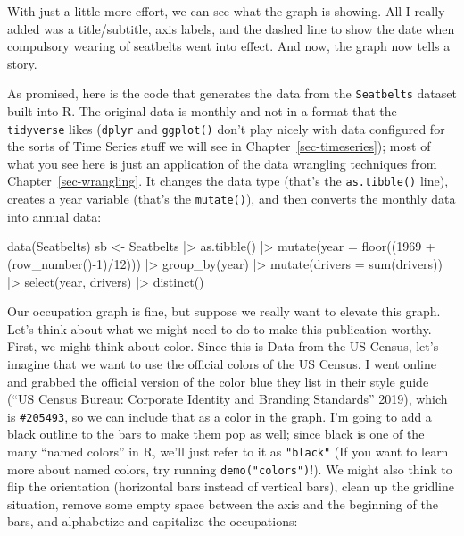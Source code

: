 \documentclass[
  letterpaper,
]{book}
\newenvironment{Shaded}{\begin{snugshade}}{\end{snugshade}}
\newcommand{\AttributeTok}[1]{\textcolor[rgb]{0.40,0.45,0.13}{#1}}
\newcommand{\DecValTok}[1]{\textcolor[rgb]{0.68,0.00,0.00}{#1}}
\newcommand{\FunctionTok}[1]{\textcolor[rgb]{0.28,0.35,0.67}{#1}}
\newcommand{\NormalTok}[1]{\textcolor[rgb]{0.00,0.23,0.31}{#1}}
\newcommand{\OtherTok}[1]{\textcolor[rgb]{0.00,0.23,0.31}{#1}}
\newcommand{\SpecialCharTok}[1]{\textcolor[rgb]{0.37,0.37,0.37}{#1}}
\begin{document}
\begin{tcolorbox}
With just a little more effort, we can see what the graph is showing.
All I really added was a title/subtitle, axis labels, and the dashed
line to show the date when compulsory wearing of seatbelts went into
effect. And now, the graph now tells a story.

As promised, here is the code that generates the data from the
\texttt{Seatbelts} dataset built into R. The original data is monthly
and not in a format that the \texttt{tidyverse} likes (\texttt{dplyr}
and \texttt{ggplot()} don't play nicely with data configured for the
sorts of Time Series stuff we will see in Chapter~\ref{sec-timeseries});
most of what you see here is just an application of the data wrangling
techniques from Chapter~\ref{sec-wrangling}. It changes the data type
(that's the \texttt{as.tibble()} line), creates a year variable (that's
the \texttt{mutate()}), and then converts the monthly data into annual
data:

\begin{Shaded}
\begin{Highlighting}[]
\FunctionTok{data}\NormalTok{(Seatbelts)}
\NormalTok{sb }\OtherTok{\textless{}{-}}\NormalTok{ Seatbelts }\SpecialCharTok{|\textgreater{}} 
  \FunctionTok{as.tibble}\NormalTok{() }\SpecialCharTok{|\textgreater{}} 
  \FunctionTok{mutate}\NormalTok{(}\AttributeTok{year =} \FunctionTok{floor}\NormalTok{((}\DecValTok{1969} \SpecialCharTok{+}\NormalTok{ (}\FunctionTok{row\_number}\NormalTok{()}\SpecialCharTok{{-}}\DecValTok{1}\NormalTok{)}\SpecialCharTok{/}\DecValTok{12}\NormalTok{))) }\SpecialCharTok{|\textgreater{}} 
  \FunctionTok{group\_by}\NormalTok{(year) }\SpecialCharTok{|\textgreater{}} 
  \FunctionTok{mutate}\NormalTok{(}\AttributeTok{drivers =} \FunctionTok{sum}\NormalTok{(drivers)) }\SpecialCharTok{|\textgreater{}} 
  \FunctionTok{select}\NormalTok{(year, drivers) }\SpecialCharTok{|\textgreater{}} 
  \FunctionTok{distinct}\NormalTok{()}
\end{Highlighting}
\end{Shaded}

\end{tcolorbox}

Our occupation graph is fine, but suppose we really want to elevate this
graph. Let's think about what we might need to do to make this
publication worthy. First, we might think about color. Since this is
Data from the US Census, let's imagine that we want to use the official
colors of the US Census. I went online and grabbed the official version
of the color blue they list in their style guide ({``US Census Bureau:
Corporate Identity and Branding Standards''} 2019), which is
\texttt{\#205493}, so we can include that as a color in the graph. I'm
going to add a black outline to the bars to make them pop as well; since
black is one of the many ``named colors'' in R, we'll just refer to it
as \texttt{"black"} (If you want to learn more about named colors, try
running \texttt{demo("colors")}!). We might also think to flip the
orientation (horizontal bars instead of vertical bars), clean up the
gridline situation, remove some empty space between the axis and the
beginning of the bars, and alphabetize and capitalize the occupations:
\end{document}
